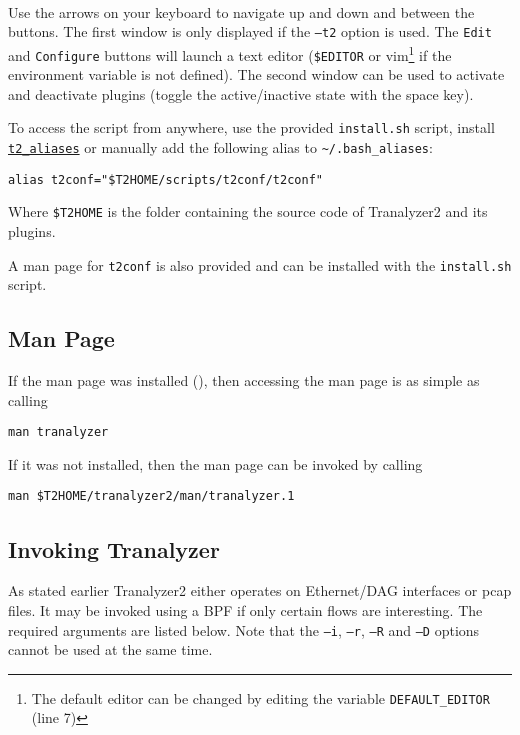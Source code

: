 \begin{figure}[!ht]
    \centering
    \begin{minipage}[b]{0.45\linewidth}
    \end{minipage}
    ~
    \begin{minipage}[b]{0.45\linewidth}
    \end{minipage}
\end{figure}

Use the arrows on your keyboard to navigate up and down and between the buttons. The first window is only displayed if the {\tt --t2} option is used. The {\tt Edit} and {\tt Configure} buttons will launch a text editor ({\tt \$EDITOR} or vim\footnote{The default editor can be changed by editing the variable {\tt DEFAULT\_EDITOR} (line 7)} if the environment variable is not defined). The second window can be used to activate and deactivate plugins (toggle the active/inactive state with the space key).

To access the script from anywhere, use the provided {\tt install.sh} script, install \hyperref[s:aliases]{\tt t2\_aliases} or manually add the following alias to {\tt \textasciitilde{}/.bash\_aliases}:
\begin{center}
    {\tt alias t2conf="\$T2HOME/scripts/t2conf/t2conf"}
\end{center}
Where {\tt \$T2HOME} is the folder containing the source code of Tranalyzer2 and its plugins.

A man page for {\tt t2conf} is also provided and can be installed with the {\tt install.sh} script.

\subsection{Man Page}
If the man page was installed (), then accessing the man page is as simple as calling

\begin{center}
    {\tt man tranalyzer}\\
\end{center}

If it was not installed, then the man page can be invoked by calling

\begin{center}
    {\tt man \$T2HOME/tranalyzer2/man/tranalyzer.1}
\end{center}

\subsection{Invoking Tranalyzer}
As stated earlier Tranalyzer2 either operates on Ethernet/DAG interfaces or pcap files. It may be invoked using a BPF if only certain flows are interesting. The required arguments are listed below. Note that the {\tt --i}, {\tt --r}, {\tt --R} and {\tt --D} options cannot be used at the same time.

